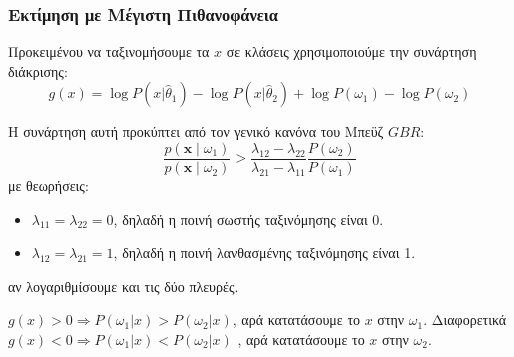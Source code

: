 \documentclass{beamer}
\begin{document}
\begin{frame}
    \frametitle{Εκτίμηση με Μέγιστη Πιθανοφάνεια}
    
    Προκειμένου να ταξινομήσουμε τα $x$ σε κλάσεις χρησιμοποιούμε την συνάρτηση διάκρισης:
    \[g(x) = \log P(x | \hat{\theta}_1) - \log P(x | \hat{\theta}_2) + \log P(\omega_1) - \log P(\omega_2)\]

    Η συνάρτηση αυτή προκύπτει από τον γενικό κανόνα του Μπεϋζ $GBR$: 
    \[\frac{p(\mathbf{x} \mid \omega_1)}{p(\mathbf{x} \mid \omega_2)} > \frac{\lambda_{12} - \lambda_{22}}{\lambda_{21} - \lambda_{11}} \frac{P(\omega_2)}{P(\omega_1)} \]
    με θεωρήσεις:

    \begin{itemize}
        \item $\lambda_{11} = \lambda_{22} = 0$, δηλαδή η ποινή σωστής ταξινόμησης είναι 0.
        \item $\lambda_{12} = \lambda_{21} = 1$, δηλαδή η ποινή λανθασμένης ταξινόμησης είναι 1.
    \end{itemize}

    αν λογαριθμίσουμε και τις δύο πλευρές.

    $g(x) > 0 \Rightarrow P(\omega_1|x) > P(\omega_2|x)$, αρά κατατάσουμε το $x$ στην $\omega_1$.
    Διαφορετικά $g(x) < 0 \Rightarrow P(\omega_1|x) <  P(\omega_2|x)$ , αρά κατατάσουμε το $x$ στην $\omega_2$.

    
\end{frame}
\end{document}

